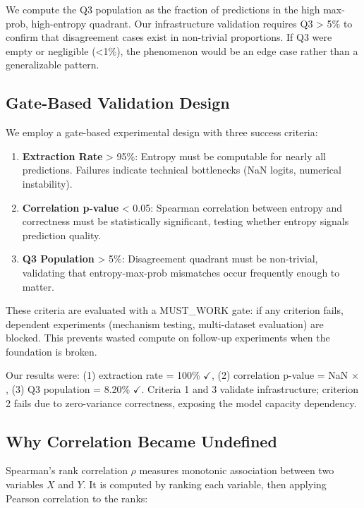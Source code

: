 We compute the Q3 population as the fraction of predictions in the high max-prob, high-entropy quadrant. Our infrastructure validation requires Q3 > 5\% to confirm that disagreement cases exist in non-trivial proportions. If Q3 were empty or negligible (<1\%), the phenomenon would be an edge case rather than a generalizable pattern.

\subsection{Gate-Based Validation Design}

We employ a gate-based experimental design with three success criteria:

\begin{enumerate}
\item \textbf{Extraction Rate} > 95\%: Entropy must be computable for nearly all predictions. Failures indicate technical bottlenecks (NaN logits, numerical instability).

\item \textbf{Correlation p-value} < 0.05: Spearman correlation between entropy and correctness must be statistically significant, testing whether entropy signals prediction quality.

\item \textbf{Q3 Population} > 5\%: Disagreement quadrant must be non-trivial, validating that entropy-max-prob mismatches occur frequently enough to matter.
\end{enumerate}

These criteria are evaluated with a MUST\_WORK gate: if any criterion fails, dependent experiments (mechanism testing, multi-dataset evaluation) are blocked. This prevents wasted compute on follow-up experiments when the foundation is broken.

Our results were: (1) extraction rate = 100\% $\checkmark$, (2) correlation p-value = NaN $\times$, (3) Q3 population = 8.20\% $\checkmark$. Criteria 1 and 3 validate infrastructure; criterion 2 fails due to zero-variance correctness, exposing the model capacity dependency.

\subsection{Why Correlation Became Undefined}

Spearman's rank correlation $\rho$ measures monotonic association between two variables $X$ and $Y$. It is computed by ranking each variable, then applying Pearson correlation to the ranks:

